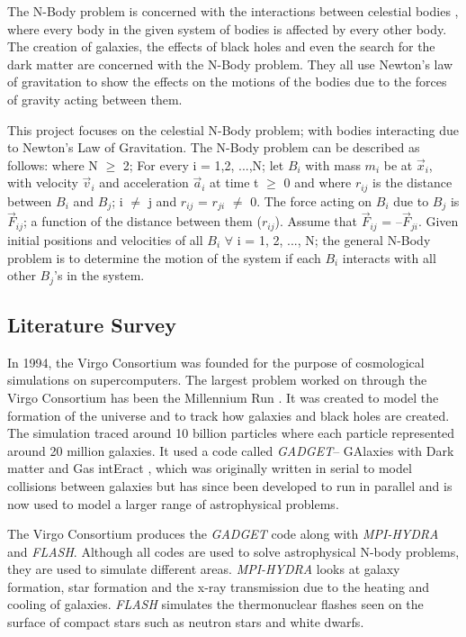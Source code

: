 \documentclass[letterpaper, 10 pt, conference]{ieeeconf}
\begin{document}
The N-Body problem is concerned with the interactions between celestial bodies \cite{c5}, where every body in the given system of bodies is affected by every other body. The creation of galaxies, the effects of black holes and even the search for the dark matter are concerned with the N-Body problem. They all use Newton’s law of gravitation to show the effects on the motions of the bodies due to the forces of gravity acting between them.\par

This project focuses on the celestial N-Body problem; with bodies interacting due to Newton’s Law of Gravitation. The N-Body problem can be described as follows: where N $\geq$ 2; For every i = 1,2, ...,N; let $B_i$ with mass $m_i$ be at $\vec{x}_i$, with velocity $\vec{v}_i$ and acceleration $\vec{a}_i$ at time t $\geq$ 0 and where $r_{ij}$ is the distance between $B_i$ and $B_j$; i $\neq$ j and $r_{ij}$ = $r_{ji}$ $\neq$ 0. The force acting on $B_i$ due to $B_j$ is $\vec{F}_{ij}$; a function of the distance between them ($r_{ij}$). Assume that $\vec{F}_{ij}$ = {--}$\vec{F}_{ji}$. Given initial positions and velocities of all $B_i$ $\forall$ i = 1, 2, ..., N; the general N-Body problem is to determine the motion of the system if each $B_i$ interacts with all other $B_j$’s in the system.


\subsection{Literature Survey}

In 1994, the Virgo Consortium was founded for the purpose of cosmological simulations on supercomputers. The largest problem worked on through the Virgo Consortium has been the Millennium Run \cite{c6}. It was created to model the formation of the universe and to track how galaxies and black holes are created. The simulation traced around 10 billion particles where each particle represented around 20 million galaxies. It used a code called \textit{GADGET}{--} GAlaxies with Dark matter and Gas intEract \cite{c7}, which was originally written in serial to model collisions between galaxies but has since been developed to run in parallel and is now used to model a larger range of astrophysical problems. \par

The Virgo Consortium produces the \textit{GADGET} code along with \textit{MPI-HYDRA} and \textit{FLASH}. Although all codes are used to solve astrophysical N-body problems, they are used to simulate different areas. \textit{MPI-HYDRA} looks at galaxy formation, star formation and the x-ray transmission due to the heating and cooling of galaxies. \textit{FLASH} simulates the thermonuclear flashes seen on the surface of compact stars such as neutron stars and white dwarfs.
\end{document}
